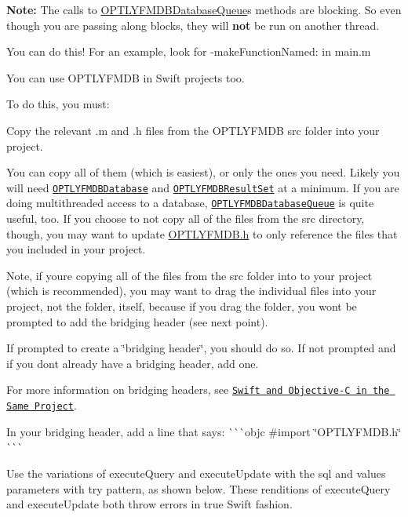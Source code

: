 {\bfseries Note\+:} The calls to {\ttfamily \mbox{\hyperlink{interface_o_p_t_l_y_f_m_d_b_database_queue}{O\+P\+T\+L\+Y\+F\+M\+D\+B\+Database\+Queue}}}\textquotesingle{}s methods are blocking. So even though you are passing along blocks, they will {\bfseries not} be run on another thread.

You can do this! For an example, look for {\ttfamily -\/make\+Function\+Named\+:} in main.\+m

You can use O\+P\+T\+L\+Y\+F\+M\+DB in Swift projects too.

To do this, you must\+:


\begin{DoxyEnumerate}
\item Copy the relevant {\ttfamily .m} and {\ttfamily .h} files from the O\+P\+T\+L\+Y\+F\+M\+DB {\ttfamily src} folder into your project.

You can copy all of them (which is easiest), or only the ones you need. Likely you will need \href{http://ccgus.github.io/optlyfmdb/html/Classes/OPTLYFMDBDatabase.html}{\tt {\ttfamily O\+P\+T\+L\+Y\+F\+M\+D\+B\+Database}} and \href{http://ccgus.github.io/optlyfmdb/html/Classes/OPTLYFMDBResultSet.html}{\tt {\ttfamily O\+P\+T\+L\+Y\+F\+M\+D\+B\+Result\+Set}} at a minimum. If you are doing multithreaded access to a database, \href{http://ccgus.github.io/optlyfmdb/html/Classes/OPTLYFMDBDatabaseQueue.html}{\tt {\ttfamily O\+P\+T\+L\+Y\+F\+M\+D\+B\+Database\+Queue}} is quite useful, too. If you choose to not copy all of the files from the {\ttfamily src} directory, though, you may want to update {\ttfamily \mbox{\hyperlink{_o_p_t_l_y_f_m_d_b_8h_source}{O\+P\+T\+L\+Y\+F\+M\+D\+B.\+h}}} to only reference the files that you included in your project.

Note, if you\textquotesingle{}re copying all of the files from the {\ttfamily src} folder into to your project (which is recommended), you may want to drag the individual files into your project, not the folder, itself, because if you drag the folder, you won\textquotesingle{}t be prompted to add the bridging header (see next point).
\item If prompted to create a \char`\"{}bridging header\char`\"{}, you should do so. If not prompted and if you don\textquotesingle{}t already have a bridging header, add one.

For more information on bridging headers, see \href{https://developer.apple.com/library/ios/documentation/Swift/Conceptual/BuildingCocoaApps/MixandMatch.html#//apple_ref/doc/uid/TP40014216-CH10-XID_76}{\tt Swift and Objective-\/C in the Same Project}.
\item In your bridging header, add a line that says\+: \`{}\`{}\`{}objc \#import \char`\"{}\+O\+P\+T\+L\+Y\+F\+M\+D\+B.\+h\char`\"{} \`{}\`{}\`{}
\item Use the variations of {\ttfamily execute\+Query} and {\ttfamily execute\+Update} with the {\ttfamily sql} and {\ttfamily values} parameters with {\ttfamily try} pattern, as shown below. These renditions of {\ttfamily execute\+Query} and {\ttfamily execute\+Update} both {\ttfamily throw} errors in true Swift fashion.
\end{DoxyEnumerate}

